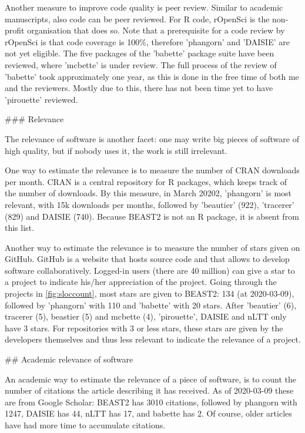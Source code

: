 Another measure to improve code quality is peer review. Similar to
academic manuscripts, also code can be peer reviewed. 
For R code, rOpenSci is the non-profit organisation that does so.
Note that a prerequisite for a code review by rOpenSci is that code coverage is 100\%,
therefore 'phangorn' and 'DAISIE' are not yet eligible.
The five packages of the 'babette' package suite have been reviewed, 
where 'mcbette' is under review. 
The full process of the review of 'babette' took approximately one year,
as this is done in the free time of both me and the reviewers.
Mostly due to this, there has not been time yet to have 'pirouette' reviewed.

### Relevance

The relevance of software is another facet: one may write big pieces
of software of high quality, but if nobody uses it, the work is 
still irrelevant.

One way to estimate the relevance is to measure the number of CRAN downloads
per month. CRAN is a central repository for R packages, which keeps
track of the number of downloads. By this measure, in March 20202,
'phangorn' is most relevant, with 15k downloads per months, followed 
by 'beautier' (922), 'tracerer' (829) and DAISIE (740). Because BEAST2
is not an R package, it is absent from this list.

Another way to estimate the relevance is to measure the number of stars
given on GitHub. GitHub is a website that hosts source code
and that allows to develop software collaboratively.
Logged-in users (there are 40 million) can give a star to a project
to indicate his/her appreciation of the project.
Going through the projects in \ref{fig:sloccount}, most stars
are given to BEAST2: 134 (at 2020-03-09), followed
by 'phangorn' with 110 and 'babette' with 20 stars.
After 'beautier' (6), tracerer (5), beastier (5)
and mcbette (4), 'pirouette', DAISIE and nLTT only have 3 stars.
For repositories with 3 or less stars, these stars are given by
the developers themselves and thus less relevant to indicate
the relevance of a project.

## Academic relevance of software

An academic way to estimate the relevance of a piece of software,
is to count the number of citations the article describing it
has received. As of 2020-03-09 these are from Google Scholar:
BEAST2 \cite{bouckaert2014beast} has 3010 citations,
followed by phangorn \cite{schliep2011phangorn} with 1247,
DAISIE \cite{valente2014effects} has 44, 
nLTT \cite{janzen2015approximate} has 17,
and babette \cite{bilderbeek2018babette} has 2. 
Of course, older articles have had more time to accumulate citations.

